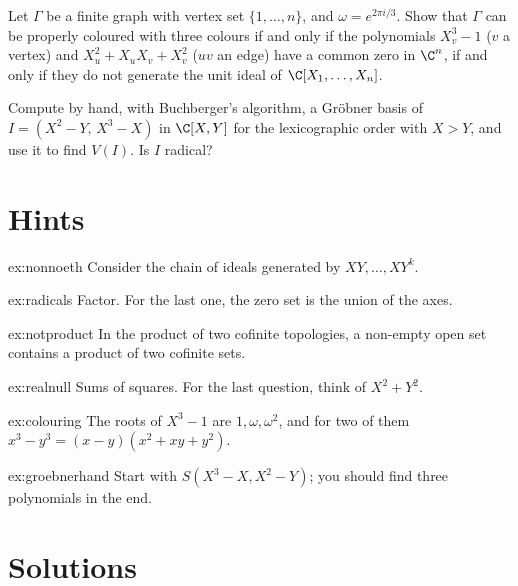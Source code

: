 \begin{exercise}[$\star\star$]\label{ex:colouring}
Let $\Gamma$ be a finite graph with vertex set $\{1,\dots,n\}$, and $\omega=e^{2\pi i/3}$. Show that $\Gamma$ can be properly coloured with three colours if and only if the polynomials $X_v^3-1$ ($v$ a vertex) and
$X_u^2+X_uX_v+X_v^2$ ($uv$ an edge) have a common zero in $\C^n$, if and only if they do not generate the unit ideal of $\C[X_1,\dots,X_n]$.
\end{exercise}

\begin{exercise}[$\star\star$]\label{ex:groebnerhand}
Compute by hand, with Buchberger's algorithm, a Gröbner basis of $I=(X^2-Y,\,X^3-X)$ in $\C[X,Y]$ for the lexicographic order with $X>Y$, and use it to find $V(I)$. Is $I$ radical?
\end{exercise}

\section{Hints}

\begin{hint}{ex:nonnoeth}
Consider the chain of ideals generated by $XY,\dots,XY^k$.
\end{hint}

\begin{hint}{ex:radicals}
Factor. For the last one, the zero set is the union of the axes.
\end{hint}

\begin{hint}{ex:notproduct}
In the product of two cofinite topologies, a non-empty open set contains a product of two cofinite sets.
\end{hint}

\begin{hint}{ex:realnull}
Sums of squares. For the last question, think of $X^2+Y^2$.
\end{hint}

\begin{hint}{ex:colouring}
The roots of $X^3-1$ are $1,\omega,\omega^2$, and for two of them $x^3-y^3=(x-y)(x^2+xy+y^2)$.
\end{hint}

\begin{hint}{ex:groebnerhand}
Start with $S(X^3-X,X^2-Y)$; you should find three polynomials in the end.
\end{hint}

\section{Solutions}

